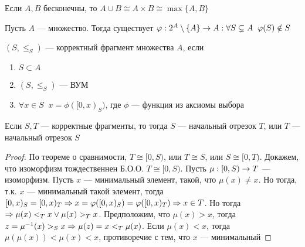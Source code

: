 
\begin{theorem}
    Если \(A, B\) бесконечны, то \(A \cup B \cong A \times B \cong \max \{A, B\}\)
\end{theorem}

\begin{proposition}
    Пусть \(A\) --- множество. Тогда существует \(\varphi: 2^A \setminus \{A\}\rightarrow A: \forall S \subsetneq A\;\;\varphi(S) \notin S\)
\end{proposition}

\begin{definition}
    \((S, \le_S)\) --- корректный фрагмент множества \(A\), если
    \begin{enumerate}
        \item \(S \subset A\)
        \item \((S, \le_S)\) --- ВУМ
        \item \(\forall x \in S\;\; x = \phi([0, x)_S)\), где \(\phi\) --- функция из аксиомы выбора
    \end{enumerate}
\end{definition}
\begin{lemma}
    Если \(S, T\) --- корректные фрагменты, то тогда \(S\) --- начальный отрезок \(T\), или \(T\) --- начальный отрезок \(S\)
\end{lemma}
\begin{proof}
    По теореме о сравнимости, \(T \cong [0, S)\), или \(T \cong S\), или \(S \cong [0, T)\). Докажем, что изоморфизм тождественнен
    Б.О.О. \(T \cong [0, S)\). Пусть \(\mu: [0, S) \rightarrow T\) --- изоморфизм. Пусть \(x\) --- минимальный элемент, такой, что \(\mu(x) \ne x\). Но тогда, т.к. \(x\) --- минимальный такой элемент, тогда \([0, x)_S = [0, x)_T \Rightarrow x = \varphi([0, x)_S) = \varphi([0, x)_T) \Rightarrow x \in T\). Но тогда \(\Rightarrow \mu(x) <_T x \vee \mu(x) >_T x\). Предположим, что \(\mu(x) > x\), тогда \(z = \mu^{-1}(x) >_S x \Rightarrow \mu(z) = x <_T \mu(x)\). Если \(\mu(x) < x\), тогда \(\mu(\mu(x)) < \mu(x) < x\), противоречие с тем, что \(x\) --- минимальный
\end{proof}

